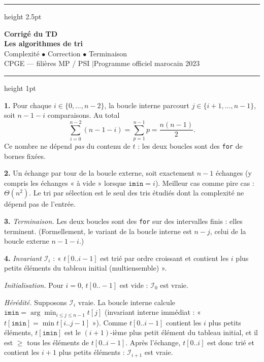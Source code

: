 \documentclass[11pt,a4paper]{article}
\begin{document}
\begin{center}
  {\color{teal}\hrule height 2.5pt}
  \vspace{10pt}
  {\Huge\bfseries\color{teal} Corrigé du TD}\\[6pt]
  {\LARGE\bfseries Les algorithmes de tri}\\[10pt]
  {\large Complexité \;$\bullet$\; Correction \;$\bullet$\; Terminaison}\\[8pt]
  {\normalsize CPGE --- filières MP / PSI \quad$|$\quad Programme officiel marocain 2023}\\[6pt]
  \vspace{6pt}
  {\color{teal}\hrule height 1pt}
\end{center}

\vspace{8pt}


\reponse
\textbf{1.} Pour chaque $i\in\{0,\dots,n-2\}$, la boucle interne parcourt
$j\in\{i+1,\dots,n-1\}$, soit $n-1-i$ comparaisons. Au total
\[
  \sum_{i=0}^{n-2}(n-1-i) = \sum_{p=1}^{n-1}p = \frac{n(n-1)}{2}.
\]
Ce nombre ne dépend \emph{pas} du contenu de $t$ : les deux boucles sont des
\texttt{for} de bornes fixées.

\textbf{2.} Un échange par tour de la boucle externe, soit exactement $n-1$ échanges
(y compris les échanges « à vide » lorsque $\texttt{imin}=i$). Meilleur cas comme pire
cas : $\Theta(n^{2})$. Le tri par sélection est le seul des tris étudiés dont la
complexité ne dépend pas de l'entrée.

\textbf{3.} \emph{Terminaison.} Les deux boucles sont des \texttt{for} sur des
intervalles finis : elles terminent. (Formellement, le variant de la boucle interne est
$n-j$, celui de la boucle externe $n-1-i$.)

\textbf{4.} \emph{Invariant} $\mathcal I_i$ : « $t[0..i-1]$ est trié par ordre croissant
et contient les $i$ plus petits éléments du tableau initial (multiensemble) ».

\emph{Initialisation.} Pour $i=0$, $t[0..-1]$ est vide : $\mathcal I_0$ est vraie.

\emph{Hérédité.} Supposons $\mathcal I_i$ vraie. La boucle interne calcule
$\texttt{imin}=\arg\min_{i\le j\le n-1} t[j]$ (invariant interne immédiat :
« $t[\texttt{imin}]=\min t[i..j-1]$ »). Comme $t[0..i-1]$ contient les $i$ plus petits
éléments, $t[\texttt{imin}]$ est le $(i+1)$-ième plus petit élément du tableau initial,
et il est $\ge$ tous les éléments de $t[0..i-1]$. Après l'échange, $t[0..i]$ est donc
trié et contient les $i+1$ plus petits éléments : $\mathcal I_{i+1}$ est vraie.
\end{document}
